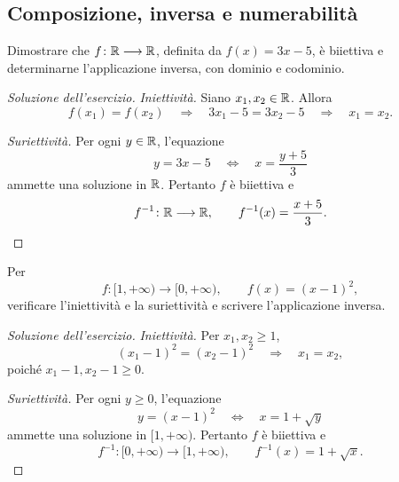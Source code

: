 \subsection{Composizione, inversa e numerabilità}
\label{sec:esercizi-fondamenti-composizione}

\begin{exercise}
\label{ex:fondamenti-inversa-funzione-affine}
Dimostrare che $f\colon\mathbb{R}\longrightarrow\mathbb{R}$, definita da
$f(x)=3x-5$, è biiettiva e determinarne l'applicazione inversa,
con dominio e codominio.
\end{exercise}
\begin{proof}[Soluzione dell'esercizio]
\emph{Iniettività.} Siano $x_1,x_2\in\mathbb{R}$. Allora
\[
  f(x_1)=f(x_2)
  \quad\Longrightarrow\quad
  3x_1-5=3x_2-5
  \quad\Longrightarrow\quad x_1=x_2.
\]

\emph{Suriettività.} Per ogni $y\in\mathbb{R}$, l'equazione
\[
  y=3x-5
  \quad\Longleftrightarrow\quad
  x=\frac{y+5}{3}
\]
ammette una soluzione in $\mathbb{R}$. Pertanto $f$ è biiettiva e
\[
  f^{-1}\colon\mathbb{R}\longrightarrow\mathbb{R},
  \qquad f^{-1}(x)=\frac{x+5}{3}.
\]
\end{proof}

\begin{exercise}
\label{ex:fondamenti-inversa-restrizione-dominio}
Per
\[
  f\colon[1,+\infty)\longrightarrow[0,+\infty),
  \qquad f(x)=(x-1)^2,
\]
verificare l'iniettività e la suriettività e scrivere
l'applicazione inversa.
\end{exercise}
\begin{proof}[Soluzione dell'esercizio]
\emph{Iniettività.} Per $x_1,x_2\ge1$,
\[
  (x_1-1)^2=(x_2-1)^2
  \quad\Longrightarrow\quad x_1=x_2,
\]
poiché $x_1-1,x_2-1\ge0$.

\emph{Suriettività.} Per ogni $y\ge0$, l'equazione
\[
  y=(x-1)^2
  \quad\Longleftrightarrow\quad x=1+\sqrt{y}
\]
ammette una soluzione in $[1,+\infty)$. Pertanto $f$ è
biiettiva e
\[
  f^{-1}\colon[0,+\infty)\longrightarrow[1,+\infty),
  \qquad f^{-1}(x)=1+\sqrt{x}.
\]
\end{proof}

